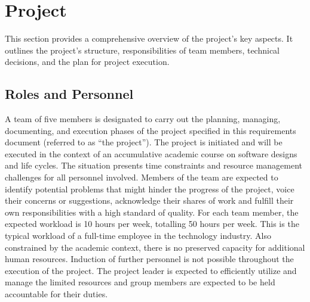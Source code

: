 \documentclass[12pt]{article}
\begin{document}
\section{Project}
This section provides a comprehensive overview of the project’s key aspects. It outlines the project’s structure, responsibilities of team members, technical decisions, and the plan for project execution.
\subsection{Roles and Personnel}
A team of five members is designated to carry out the planning, managing, documenting, and execution phases of the project specified in this requirements document (referred to as “the project”). The project is initiated and will be executed in the context of an accumulative academic course on software designs and life cycles. The situation presents time constraints and resource management challenges for all personnel involved. Members of the team are expected to identify potential problems that might hinder the progress of the project, voice their concerns or suggestions, acknowledge their shares of work and fulfill their own responsibilities with a high standard of quality. For each team member, the expected workload is 10 hours per week, totalling 50 hours per week. This is the typical workload of a full-time employee in the technology industry. Also constrained by the academic context, there is no preserved capacity for additional human resources. Induction of further personnel is not possible throughout the execution of the project. The project leader is expected to efficiently utilize and manage the limited resources and group members are expected to be held accountable for their duties.
\end{document}
